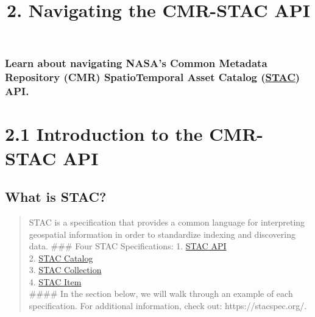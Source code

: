 \documentclass[
  letterpaper,
]{scrartcl}
\title{2. Navigating the CMR-STAC API}
\author{}
\date{}
\begin{document}
\maketitle

{
\setcounter{tocdepth}{3}
\tableofcontents
}
\hypertarget{learn-about-navigating-nasas-common-metadata-repository-cmr-spatiotemporal-asset-catalog-stac-api.}{%
\subsubsection{\texorpdfstring{Learn about navigating NASA's Common
Metadata Repository (CMR) SpatioTemporal Asset Catalog
(\href{https://stacspec.org/}{STAC})
API.}{Learn about navigating NASA's Common Metadata Repository (CMR) SpatioTemporal Asset Catalog (STAC) API.}}\label{learn-about-navigating-nasas-common-metadata-repository-cmr-spatiotemporal-asset-catalog-stac-api.}}

\hypertarget{introduction-to-the-cmr-stac-api}{%
\section{\texorpdfstring{2.1 Introduction to the CMR-STAC API
}{2.1 Introduction to the CMR-STAC API }}\label{introduction-to-the-cmr-stac-api}}

\hypertarget{what-is-stac}{%
\subsection{What is STAC?}\label{what-is-stac}}

\begin{quote}
STAC is a specification that provides a common language for interpreting
geospatial information in order to standardize indexing and discovering
data. \#\#\# Four STAC Specifications: 1.
\href{https://github.com/radiantearth/stac-api-spec}{STAC API}\\
2.
\href{https://github.com/radiantearth/stac-spec/blob/master/catalog-spec/catalog-spec.md}{STAC
Catalog}\\
3.
\href{https://github.com/radiantearth/stac-spec/blob/master/collection-spec/collection-spec.md}{STAC
Collection}\\
4.
\href{https://github.com/radiantearth/stac-spec/blob/master/item-spec/item-spec.md}{STAC
Item}\\
\#\#\#\# In the section below, we will walk through an example of each
specification. For additional information, check out:
https://stacspec.org/.
\end{quote}
\end{document}
